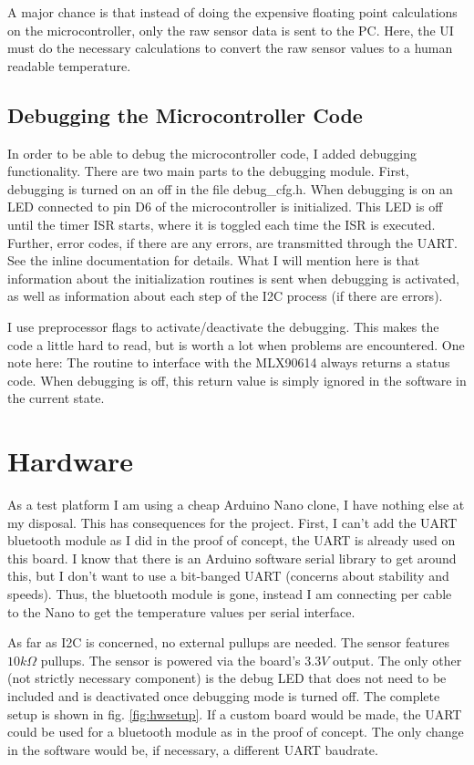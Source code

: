 \documentclass{article}[12pt]
\begin{document}
A major chance is that instead of doing the expensive floating point calculations on the microcontroller, only the raw sensor data is sent to the PC. Here, the UI must do the necessary calculations to convert the raw sensor values to a human readable temperature. 

\subsection{Debugging the Microcontroller Code}

In order to be able to debug the microcontroller code, I added debugging functionality. There are two main parts to the debugging module. First, debugging is turned on an off in the file debug\_cfg.h. When debugging is on an LED connected to pin D6 of the microcontroller is initialized. This LED is off until the timer ISR starts, where it is toggled each time the ISR is executed. Further, error codes, if there are any errors, are transmitted through the UART. See the inline documentation for details. What I will mention here is that information about the initialization routines is sent when debugging is activated, as well as information about each step of the I2C process (if there are errors).

I use preprocessor flags to activate/deactivate the debugging. This makes the code a little hard to read, but is worth a lot when problems are encountered. One note here: The routine to interface with the MLX90614 always returns a status code. When debugging is off, this return value is simply ignored in the software in the current state.

\section{Hardware}

As a test platform I am using a cheap Arduino Nano clone, I have nothing else at my disposal. This has consequences for the project. First, I can't add the UART bluetooth module as I did in the proof of concept, the UART is already used on this board. I know that there is an Arduino software serial library to get around this, but I don't want to use a bit-banged UART (concerns about stability and speeds). Thus, the bluetooth module is gone, instead I am connecting per cable to the Nano to get the temperature values per serial interface.

As far as I2C is concerned, no external pullups are needed. The sensor features $10k\Omega$ pullups. The sensor is powered via the board's $3.3V$ output. The only other (not strictly necessary component) is the debug LED that does not need to be included and is deactivated once debugging mode is turned off. The complete setup is shown in fig. \ref{fig:hwsetup}. If a custom board would be made, the UART could be used for a bluetooth module as in the proof of concept. The only change in the software would be, if necessary, a different UART baudrate.
\end{document}
